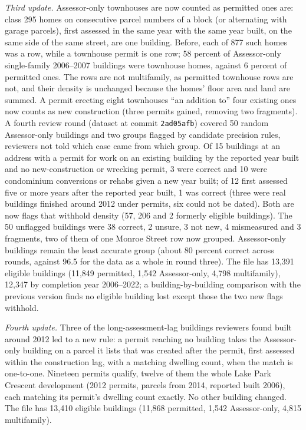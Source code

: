 \textit{Third update.} Assessor-only townhouses are now counted as permitted ones are: class 295 homes on consecutive
parcel numbers of a block (or alternating with garage parcels), first assessed in the same year with the same year
built, on the same side of the same street, are one building. Before, each of 877 such homes was a row, while a
townhouse permit is one row; 58 percent of Assessor-only single-family 2006--2007 buildings were townhouse homes,
against 6 percent of permitted ones. The rows are not multifamily, as permitted townhouse rows are not, and their
density is unchanged because the homes' floor area and land are summed. A permit erecting eight townhouses ``an
addition to'' four existing ones now counts as new construction (three permits gained, removing two fragments). A
fourth review round (dataset at commit \texttt{2ad05afb}) covered 50 random Assessor-only buildings and two groups
flagged by candidate precision rules, reviewers not told which case came from which group. Of 15 buildings at an
address with a permit for work on an existing building by the reported year built and no new-construction or wrecking
permit, 3 were correct and 10 were condominium conversions or rehabs given a new year built; of 12 first assessed five
or more years after the reported year built, 1 was correct (three were real buildings finished around 2012 under
permits, six could not be dated). Both are now flags that withhold density (57, 206 and 2 formerly eligible buildings).
The 50 unflagged buildings were 38 correct, 2 unsure, 3 not new, 4 mismeasured and 3 fragments, two of them of one
Monroe Street row now grouped. Assessor-only buildings remain the least accurate group (about 80 percent correct across rounds, against 96.5
for the data as a whole in round three). The file has 13,391 eligible buildings (11,849 permitted, 1,542
Assessor-only, 4,798 multifamily), 12,347 by completion year 2006--2022; a building-by-building comparison with the
previous version finds no eligible building lost except those the two new flags withhold.

\textit{Fourth update.} Three of the long-assessment-lag buildings reviewers found built around 2012 led to a new rule:
a permit reaching no building takes the Assessor-only building on a parcel it lists that was created after the permit,
first assessed within the construction lag, with a matching dwelling count, when the match is one-to-one. Nineteen
permits qualify, twelve of them the whole Lake Park Crescent development (2012 permits, parcels from 2014, reported built
2006), each matching its permit's dwelling count exactly. No other building changed. The file has 13,410 eligible
buildings (11,868 permitted, 1,542 Assessor-only, 4,815 multifamily).

